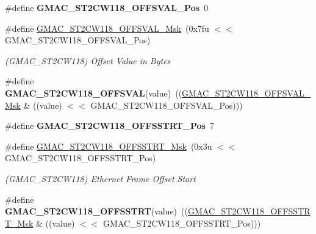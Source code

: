 \begin{DoxyCompactItemize}
\item 
\mbox{\label{group__SAME70__GMAC_ga06a7c4b8046a08b969a75fe42982918c}} 
\#define {\bfseries G\+M\+A\+C\+\_\+\+S\+T2\+C\+W118\+\_\+\+O\+F\+F\+S\+V\+A\+L\+\_\+\+Pos}~0
\item 
\mbox{\label{group__SAME70__GMAC_gaa05ecdd83b5db4eec29622cf077a1deb}} 
\#define \mbox{\hyperlink{group__SAME70__GMAC_gaa05ecdd83b5db4eec29622cf077a1deb}{G\+M\+A\+C\+\_\+\+S\+T2\+C\+W118\+\_\+\+O\+F\+F\+S\+V\+A\+L\+\_\+\+Msk}}~(0x7fu $<$$<$ G\+M\+A\+C\+\_\+\+S\+T2\+C\+W118\+\_\+\+O\+F\+F\+S\+V\+A\+L\+\_\+\+Pos)
\begin{DoxyCompactList}\small\item\em (G\+M\+A\+C\+\_\+\+S\+T2\+C\+W118) Offset Value in Bytes \end{DoxyCompactList}\item 
\mbox{\label{group__SAME70__GMAC_ga610b3c8d3d29652e44882c9ee6f3c7b6}} 
\#define {\bfseries G\+M\+A\+C\+\_\+\+S\+T2\+C\+W118\+\_\+\+O\+F\+F\+S\+V\+AL}(value)~((\mbox{\hyperlink{group__SAMV71__GMAC_gaa05ecdd83b5db4eec29622cf077a1deb}{G\+M\+A\+C\+\_\+\+S\+T2\+C\+W118\+\_\+\+O\+F\+F\+S\+V\+A\+L\+\_\+\+Msk}} \& ((value) $<$$<$ G\+M\+A\+C\+\_\+\+S\+T2\+C\+W118\+\_\+\+O\+F\+F\+S\+V\+A\+L\+\_\+\+Pos)))
\item 
\mbox{\label{group__SAME70__GMAC_ga7eb27b6fb54f247759667399d761333d}} 
\#define {\bfseries G\+M\+A\+C\+\_\+\+S\+T2\+C\+W118\+\_\+\+O\+F\+F\+S\+S\+T\+R\+T\+\_\+\+Pos}~7
\item 
\mbox{\label{group__SAME70__GMAC_gaefc55045aed0f9700b628c96a22d5d11}} 
\#define \mbox{\hyperlink{group__SAME70__GMAC_gaefc55045aed0f9700b628c96a22d5d11}{G\+M\+A\+C\+\_\+\+S\+T2\+C\+W118\+\_\+\+O\+F\+F\+S\+S\+T\+R\+T\+\_\+\+Msk}}~(0x3u $<$$<$ G\+M\+A\+C\+\_\+\+S\+T2\+C\+W118\+\_\+\+O\+F\+F\+S\+S\+T\+R\+T\+\_\+\+Pos)
\begin{DoxyCompactList}\small\item\em (G\+M\+A\+C\+\_\+\+S\+T2\+C\+W118) Ethernet Frame Offset Start \end{DoxyCompactList}\item 
\mbox{\label{group__SAME70__GMAC_ga40d3e7f5c8c7734f24f0aebb34a1caf6}} 
\#define {\bfseries G\+M\+A\+C\+\_\+\+S\+T2\+C\+W118\+\_\+\+O\+F\+F\+S\+S\+T\+RT}(value)~((\mbox{\hyperlink{group__SAMV71__GMAC_gaefc55045aed0f9700b628c96a22d5d11}{G\+M\+A\+C\+\_\+\+S\+T2\+C\+W118\+\_\+\+O\+F\+F\+S\+S\+T\+R\+T\+\_\+\+Msk}} \& ((value) $<$$<$ G\+M\+A\+C\+\_\+\+S\+T2\+C\+W118\+\_\+\+O\+F\+F\+S\+S\+T\+R\+T\+\_\+\+Pos)))

\end{DoxyCompactItemize}
